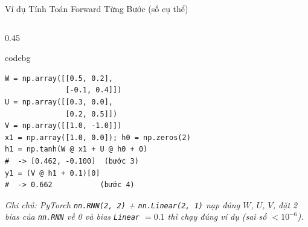 \documentclass[aspectratio=169, 10pt]{beamer}
\newenvironment{codebox}{\begin{beamercolorbox}[sep=3pt, rounded=true]{codebg}\footnotesize\ttfamily}{\end{beamercolorbox}}
\begin{document}
\begin{frame}[fragile]{Ví dụ Tính Toán Forward Từng Bước (số cụ thể)}
\begin{columns}[T]
\begin{column}{0.45\textwidth}
\begin{codebox}\scriptsize\begin{verbatim}
W = np.array([[0.5, 0.2],
              [-0.1, 0.4]])
U = np.array([[0.3, 0.0],
              [0.2, 0.5]])
V = np.array([[1.0, -1.0]])
x1 = np.array([1.0, 0.0]); h0 = np.zeros(2)
h1 = np.tanh(W @ x1 + U @ h0 + 0)
#  -> [0.462, -0.100]  (bước 3)
y1 = (V @ h1 + 0.1)[0]
#  -> 0.662           (bước 4)
\end{verbatim}\end{codebox}

\vspace{0.06cm}
{\scriptsize \textcolor{slate}{\textit{Ghi chú: PyTorch \texttt{nn.RNN(2,\,2)} + \texttt{nn.Linear(2,\,1)} nạp đúng $W$, $U$, $V$, đặt 2 bias của \texttt{nn.RNN} về 0 và bias \texttt{Linear} $= 0.1$ thì chạy đúng ví dụ (sai số $< 10^{-6}$).}}}
\end{column}
\end{columns}

\end{frame}
\end{document}
